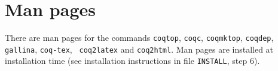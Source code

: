 \section{Man pages}\label{ManPages}

There are man pages for the commands {\tt coqtop}, {\tt coqc}, {\tt coqmktop},
{\tt coqdep}, {\tt gallina},\linebreak{} {\tt coq-tex}, {\tt
coq2latex} and {\tt coq2html}. Man pages are installed at installation time
(see installation instructions in file {\tt INSTALL}, step 6).



